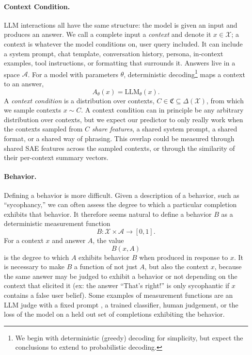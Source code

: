 \documentclass[11pt]{article}
\theoremstyle{definition}
\theoremstyle{definition}
\theoremstyle{assumptionstyle}
\newcommand{\LLM}{\mathrm{LLM}}
\begin{document}
\paragraph{Context Condition.}
LLM interactions all have the same structure: the model is given an input and
produces an answer. We call a complete input a \emph{context} and denote it
\(x\in\mathcal X\); a context is whatever the model conditions on, user query included.
It can include a system prompt, chat template, conversation history, persona,
in-context examples, tool instructions, or formatting that surrounds it.
Answers live in a space \(\mathcal A\). For a model with parameters \(\theta\),
deterministic decoding\footnote{We begin with deterministic (greedy) decoding for
simplicity, but expect the conclusions to extend to probabilistic decoding.} maps
a context to an answer,
\[
A_\theta(x)=\LLM_\theta(x).
\]
A \emph{context condition} is a distribution over contexts,
\(C\in\mathfrak C\subseteq\Delta(\mathcal X)\), from which we sample contexts
\(x\sim C\). A context condition can in principle be any arbitrary distribution
over contexts, but we expect our predictor to only really work when the contexts
sampled from \(C\) \emph{share features}, a shared system prompt, a shared format,
or a shared way of phrasing. This overlap could be measured through shared SAE
features across the sampled contexts, or through the similarity of their
per-context summary vectors.
\paragraph{Behavior.}
Defining a behavior is more difficult. Given a description of a behavior, such
as ``sycophancy,'' we can often assess the degree to which a particular completion exhibits
that behavior. It therefore seems natural to define a behavior \(B\) as a deterministic
measurement function
\[
B:\mathcal X\times\mathcal A\to[0,1].
\]
For a context \(x\) and answer \(A\), the value
\[
B(x,A)
\]
is the degree to which \(A\) exhibits behavior \(B\) when produced in response
to \(x\). It is necessary to make \(B\) a function of not just \(A\), but also
the context \(x\), because the same answer may be judged to
exhibit a behavior or not depending on the context that elicited it (ex: the
answer ``That's right!'' is only sycophantic if \(x\) contains a
false user belief).
Some examples of measurement functions are an LLM judge with a fixed prompt \cite{zheng2023judge}, a trained classifier, human judgement, or the loss of the model on a held out set of completions exhibiting the behavior.
\end{document}

